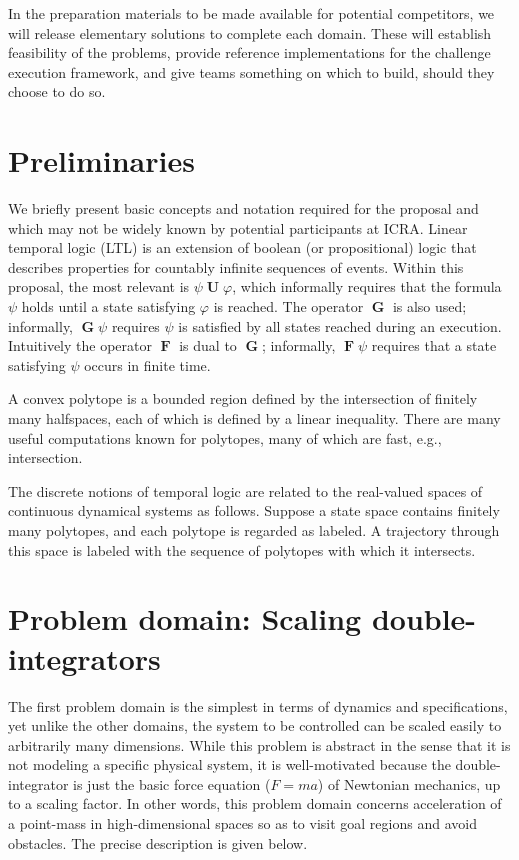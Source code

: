 \documentclass[12pt]{amsart}
\DeclareMathOperator{\Galways}{\mathbf{G}}
\DeclareMathOperator{\Feventually}{\mathbf{F}}
\DeclareMathOperator{\Uuntil}{\mathbf{U}}
\begin{document}
In the preparation materials to be made available for potential competitors, we
will release elementary solutions to complete each domain.  These will establish
feasibility of the problems, provide reference implementations for the challenge
execution framework, and give teams something on which to build, should they
choose to do so.


\section{Preliminaries}

We briefly present basic concepts and notation required for the proposal and
which may not be widely known by potential participants at ICRA.  Linear
temporal logic (LTL) is an extension of boolean (or propositional) logic that
describes properties for countably infinite sequences of events.  Within this
proposal, the most relevant is $\psi \Uuntil \varphi$, which informally requires
that the formula $\psi$ holds until a state satisfying $\varphi$ is reached.
The operator $\Galways$ is also used; informally, $\Galways \psi$ requires
$\psi$ is satisfied by all states reached during an execution.  Intuitively the
operator $\Feventually$ is dual to $\Galways$; informally, $\Feventually \psi$
requires that a state satisfying $\psi$ occurs in finite time.

A convex polytope is a bounded region defined by the intersection of finitely
many halfspaces, each of which is defined by a linear inequality.  There are
many useful computations known for polytopes, many of which are fast, e.g.,
intersection. \cite{Fukuda2004}

The discrete notions of temporal logic are related to the real-valued spaces of
continuous dynamical systems as follows.  Suppose a state space contains
finitely many polytopes, and each polytope is regarded as labeled.  A trajectory
through this space is labeled with the sequence of polytopes with which it
intersects.


\section{Problem domain: Scaling double-integrators}\label{sec:scalingdoubleinteg}

The first problem domain is the simplest in terms of dynamics and
specifications, yet unlike the other domains, the system to be controlled can be
scaled easily to arbitrarily many dimensions.  While this problem is abstract in
the sense that it is not modeling a specific physical system, it is
well-motivated because the double-integrator is just the basic force equation
($F=ma$) of Newtonian mechanics, up to a scaling factor.  In other words, this
problem domain concerns acceleration of a point-mass in high-dimensional spaces
so as to visit goal regions and avoid obstacles.  The precise description is
given below.
\end{document}
